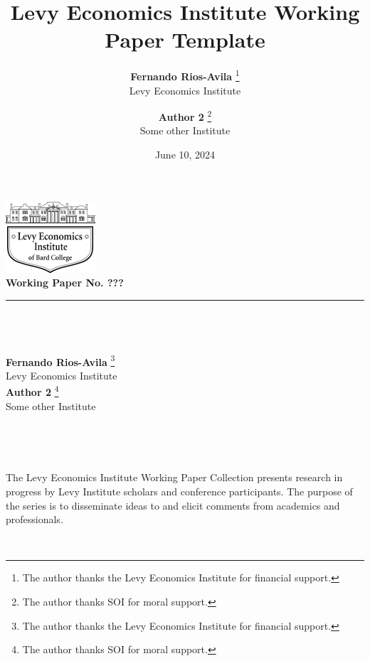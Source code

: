 \documentclass[
  12pt,
]{article}
\title{
        Levy Economics Institute Working Paper Template
            }
\author{
\textbf{Fernando Rios-Avila}
\footnote{The author thanks the Levy Economics Institute for financial
support.}\\
Levy Economics Institute\\[0.5cm]
\and 
\textbf{Author 2}
\footnote{The author thanks SOI for moral support.}\\
Some other Institute\\[0.5cm]
}
\date{June 10, 2024}
\begin{document}
\let\origfootnoterule\footnoterule
\renewcommand{\footnoterule}{}



\begin{titlepage}

\begin{minipage}[t][0.70\textheight][t]{\textwidth} 
\renewcommand{\thempfootnote}{\fnsymbol{mpfootnote}} 
    \centering
    \includegraphics[width=0.25\textwidth]{logo.png}\\[0.25cm]
    \textbf{\large{\textcolor{levyblue}{Working Paper No. ???}}}\\[0.3cm]

    \textcolor{lightgray}{\rule{0.8\textwidth}{0.5mm}}\\[0.5cm]

     \\[0.5cm]
     
     \\[0.5cm]

 
 \textbf{Fernando Rios-Avila}
 \footnote{The author thanks the Levy Economics Institute for financial
 support.}\\
 Levy Economics Institute\\[0.5cm]

 \textbf{Author 2}
 \footnote{The author thanks SOI for moral support.}\\
 Some other Institute\\[0.5cm]



 \vfill 
 ~
 \end{minipage}
 

\center{\textcolor{lightgray}{\rule{0.8\textwidth}{0.5mm}}}\\[0.5cm]
        \vfill
    \begin{minipage}[b][0.20\textheight][b]{\textwidth}
    
        
        \begin{minipage}{\textwidth}
            \small
            The Levy Economics Institute Working Paper Collection presents research in progress by Levy Institute scholars and conference participants. The purpose of the series is to disseminate ideas to and elicit comments from academics and professionals.
        \end{minipage}\\[0.5cm]


\end{minipage}
\end{titlepage}
\end{document}
